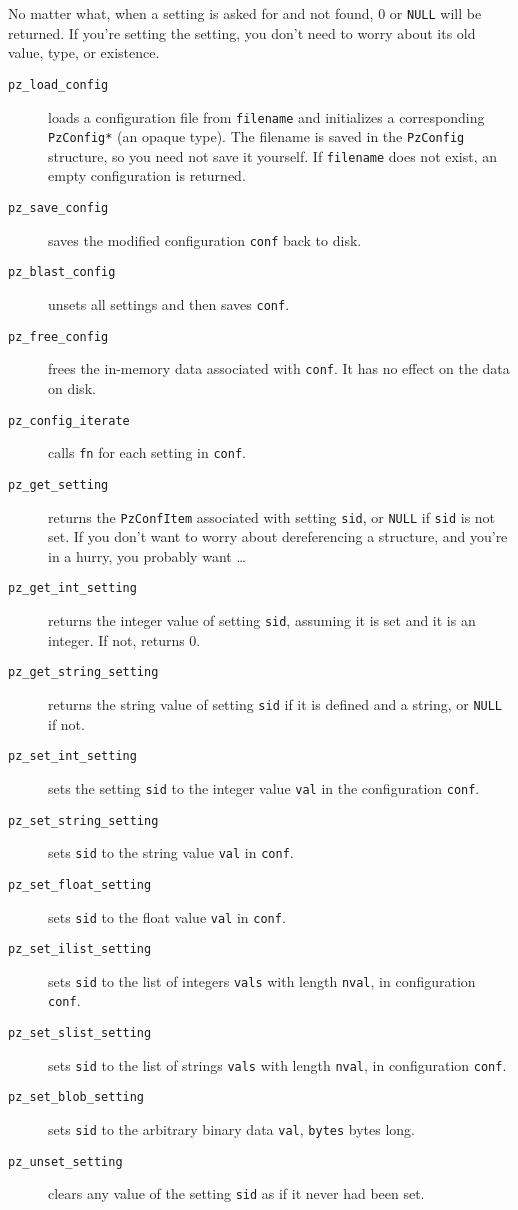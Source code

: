 \documentclass[12pt,letterpaper]{report}
\let\ttt\tt
\def\tt{\def\_{{\ttt\char`\_}}\ttt}
\begin{document}
No matter what, when a setting is asked for and not found, 0 or \verb|NULL| will be returned.
If you're setting the setting, you don't need to worry about its old value, type, or existence.

\begin{description}
\item[{\tt pz_load_config}] loads a configuration file from \verb|filename| and initializes a
corresponding \verb|PzConfig*| (an opaque type). The filename is saved in the \verb|PzConfig|
structure, so you need not save it yourself. If \verb|filename| does not exist, an empty
configuration is returned.
\item[{\tt pz_save_config}] saves the modified configuration \verb|conf| back to disk.
\item[{\tt pz_blast_config}] unsets all settings and then saves \verb|conf|.
\item[{\tt pz_free_config}] frees the in-memory data associated with \verb|conf|. It has
no effect on the data on disk.
\item[{\tt pz_config_iterate}] calls \verb|fn| for each setting in \verb|conf|.
\vskip6pt
\item[{\tt pz_get_setting}] returns the \verb|PzConfItem| associated with setting \verb|sid|,
or \verb|NULL| if \verb|sid| is not set. If you don't want to worry about dereferencing a structure,
and you're in a hurry, you probably want \ldots
\item[{\tt pz_get_int_setting}] returns the integer value of setting \verb|sid|, assuming it is set
and it is an integer. If not, returns 0.
\item[{\tt pz_get_string_setting}] returns the string value of setting \verb|sid| if it is defined
and a string, or \verb|NULL| if not.
\vskip6pt
\item[{\tt pz_set_int_setting}] sets the setting \verb|sid| to the integer value \verb|val| in
the configuration \verb|conf|.
\item[{\tt pz_set_string_setting}] sets \verb|sid| to the string value \verb|val| in \verb|conf|.
\item[{\tt pz_set_float_setting}] sets \verb|sid| to the float value \verb|val| in \verb|conf|.
\item[{\tt pz_set_ilist_setting}] sets \verb|sid| to the list of integers \verb|vals| with length \verb|nval|, in configuration \verb|conf|.
\item[{\tt pz_set_slist_setting}] sets \verb|sid| to the list of strings \verb|vals| with length \verb|nval|, in configuration \verb|conf|.
\item[{\tt pz_set_blob_setting}] sets \verb|sid| to the arbitrary binary data \verb|val|, \verb|bytes| bytes long.
\vskip6pt
\item[{\tt pz_unset_setting}] clears any value of the setting \verb|sid| as if it never had been set.
\end{description}
\end{document}
